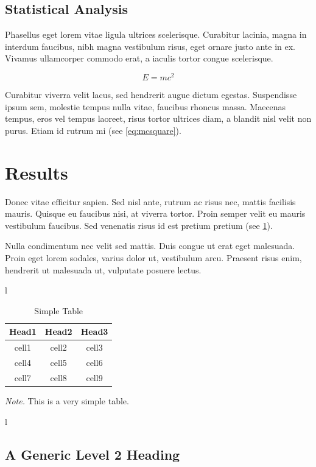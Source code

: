 \documentclass[a4paper,12pt,stu,donotrepeattitle,floatsintext,twoside]{apa7}
\newcommand{\MAEtable}[5]{
    \ifx  l#5 \begin{landscape}\fi
    \begin{table}[htbp]
        \begin{threeparttable}[htbp]
            \caption{#2}
            \label{#1}
                #3
            \begin{tablenotes}
                \linespread{1.75}\selectfont
                \textit{Note.} #4
            \end{tablenotes}
        \end{threeparttable}
    \end{table}
    \ifx  l#5 \end{landscape}\fi
}
\begin{document}
\subsection{Statistical Analysis}

Phasellus eget lorem vitae ligula ultrices scelerisque. Curabitur lacinia, magna in interdum faucibus, nibh magna vestibulum risus, eget ornare justo ante in ex. Vivamus ullamcorper commodo erat, a iaculis tortor congue scelerisque.

\begin{equation}\label{eq:mcsquare}
    E=mc^2
\end{equation}

Curabitur viverra velit lacus, sed hendrerit augue dictum egestas. Suspendisse ipsum sem, molestie tempus nulla vitae, faucibus rhoncus massa. Maecenas tempus, eros vel tempus laoreet, risus tortor ultrices diam, a blandit nisl velit non purus. Etiam id rutrum mi (see \cref{eq:mcsquare}).

\section{Results}
\label{sec:4}

Donec vitae efficitur sapien. Sed nisl ante, rutrum ac risus nec, mattis facilisis mauris. Quisque eu faucibus nisi, at viverra tortor. Proin semper velit eu mauris vestibulum faucibus. Sed venenatis risus id est pretium pretium (see \cref{tab:simple}).

Nulla condimentum nec velit sed mattis. Duis congue ut erat eget malesuada. Proin eget lorem sodales, varius dolor ut, vestibulum arcu. Praesent risus enim, hendrerit ut malesuada ut, vulputate posuere lectus.

\MAEtable{tab:simple}{Simple Table}{
    \begin{tabular}{ccc}
        \hline
        Head1 & Head2 & Head3 \\
        \hline
        cell1 & cell2 & cell3 \\
        cell4 & cell5 & cell6 \\
        cell7 & cell8 & cell9 \\
        \hline
    \end{tabular}
}{This is a very simple table.}{}

\subsection{A Generic Level 2 Heading}
\end{document}
